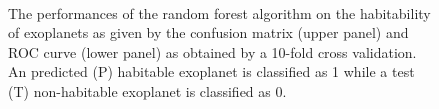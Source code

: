 \documentclass[
12pt, %
a4paper, %
oneside, %
headinclude,footinclude, %
BCOR5mm, %
]{scrartcl}
\begin{document}
\begin{figure}[h]
  \centering
{}\\
\caption{The performances of the random forest algorithm on the habitability of exoplanets as given by the confusion matrix (upper panel) and ROC curve (lower panel) as obtained by a 10-fold cross validation. An predicted (P) habitable exoplanet is classified as 1 while a test (T) non-habitable exoplanet is classified as 0.}
\label{Random_forest_tree_results}
\end{figure}
\end{document}
